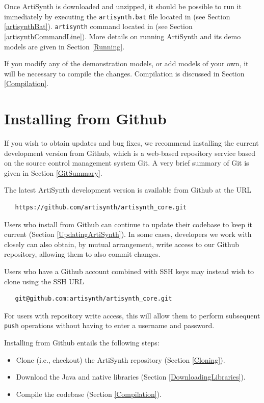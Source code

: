 Once ArtiSynth is downloaded and unzipped, it should be possible to
run it immediately by executing the
\ifWindows
{\tt artisynth.bat} file located in 
(see Section \ref{artisynthBat}).
\else
{\tt artisynth} command located in 
(see Section \ref{artisynthCommandLine}).
\fi
More details on running ArtiSynth and its demo models are given in
Section \ref{Running}.

If you modify any of the demonstration models, or add models of your
own, it will be necessary to compile the changes. Compilation is
discussed in Section \ref{Compilation}. 

\section{Installing from Github}
\label{GitClone}

If you wish to obtain updates and bug fixes, we recommend installing
the current development version from Github, which is a web-based
repository service based on the source control management system
Git. A very brief summary of Git is given in Section \ref{GitSummary}.

The latest ArtiSynth development version is available from Github at the URL
\begin{verbatim}
   https://github.com/artisynth/artisynth_core.git
\end{verbatim}
Users who install from Github can continue to update their codebase to
keep it current (Section \ref{UpdatingArtiSynth}).  In some cases,
developers we work with closely can also obtain, by mutual
arrangement, write access to our Github repository, allowing them to
also commit changes.

\begin{sideblock}
Users who have a Github account combined with SSH keys may instead
wish to clone using the SSH URL
\begin{verbatim}
   git@github.com:artisynth/artisynth_core.git
\end{verbatim}
For users with repository write access, this will allow them to
perform subsequent {\tt push} operations without having to
enter a username and password.
\end{sideblock}

Installing from Github entails the following steps:

\begin{itemize}

\item Clone (i.e., checkout) the ArtiSynth repository
(Section \ref{Cloning}).

\item Download the Java and native libraries 
(Section \ref{DownloadingLibraries}).

\item Compile the codebase (Section \ref{Compilation}).

\end{itemize}

